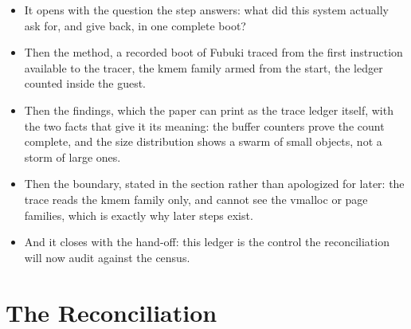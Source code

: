 \documentclass[11pt]{article}
\begin{document}
\begin{itemize}
\item It opens with the question the step answers: what did this system actually ask for, and give back, in one complete boot?
\item Then the method, a recorded boot of Fubuki traced from the first instruction available to the tracer, the kmem family armed from the start, the ledger counted inside the guest.
\item Then the findings, which the paper can print as the trace ledger itself, with the two facts that give it its meaning: the buffer counters prove the count complete, and the size distribution shows a swarm of small objects, not a storm of large ones.
\item Then the boundary, stated in the section rather than apologized for later: the trace reads the kmem family only, and cannot see the vmalloc or page families, which is exactly why later steps exist.
\item And it closes with the hand-off: this ledger is the control the reconciliation will now audit against the census.
\end{itemize}

\section{The Reconciliation}
\end{document}
